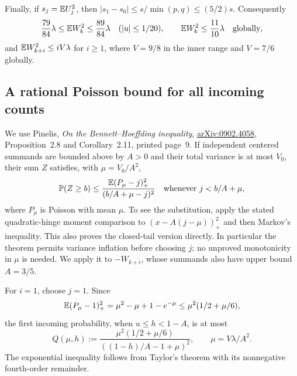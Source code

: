 Finally, if $s_j=\mathbb E U_j^2$, then
$|s_1-s_0|\le s/\min(p,q)\le(5/2)s$. Consequently
\begin{equation}\label{v10:moderate:variances}
 \frac{79}{84}\lambda\le\mathbb E W_k^2\le\frac{89}{84}\lambda
      \quad(|u|\le1/20),\qquad
 \mathbb E W_k^2\le\frac{11}{10}\lambda\quad\hbox{globally},
\end{equation}
and $\mathbb E W_{k+i}^2\le iV\lambda$ for $i\ge1$, where $V=9/8$ in
the inner range and $V=7/6$ globally.

\subsection{A rational Poisson bound for all incoming counts}
We use Pinelis, \emph{On the Bennett--Hoeffding inequality},
\href{https://arxiv.org/abs/0902.4058}{arXiv:0902.4058}, Proposition~2.8
and Corollary~2.11, printed page~9. If independent centered summands
are bounded above by $A>0$ and their total variance is at most $V_0$,
their sum $Z$ satisfies, with $\mu=V_0/A^2$,
\begin{equation}\label{v10:moderate:p2}
 \mathbb P(Z\ge b)\le
 \frac{\mathbb E(P_\mu-j)_+^2}{(b/A+\mu-j)^2}
 \quad\text{whenever }j<b/A+\mu,
\end{equation}
where $P_\mu$ is Poisson with mean $\mu$. To see the substitution,
apply the stated quadratic-hinge moment comparison to
$(x-A(j-\mu))_+^2$ and then Markov's inequality. This also proves the
closed-tail version directly. In particular the theorem permits variance
inflation before choosing $j$; no unproved monotonicity in $\mu$ is needed.
We apply it to $-W_{k+i}$, whose summands also have upper bound $A=3/5$.

For $i=1$, choose $j=1$. Since
\[
 \mathbb E(P_\mu-1)_+^2=\mu^2-\mu+1-e^{-\mu}
                    \le\mu^2(1/2+\mu/6),
\]
the first incoming probability, when $u\le h<1-A$, is at most
\begin{equation}\label{v10:moderate:first}
 Q(\mu,h):=\frac{\mu^2(1/2+\mu/6)}{((1-h)/A-1+\mu)^2},
 \qquad\mu=V\lambda/A^2.
\end{equation}
The exponential inequality follows from Taylor's theorem with its
nonnegative fourth-order remainder.

